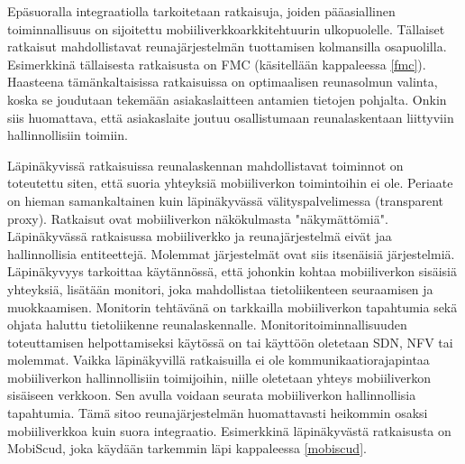 Epäsuoralla integraatiolla tarkoitetaan ratkaisuja, joiden pääasiallinen toiminnallisuus on sijoitettu mobiiliverkkoarkkitehtuurin ulkopuolelle. 
Tällaiset ratkaisut mahdollistavat reunajärjestelmän tuottamisen kolmansilla osapuolilla. Esimerkkinä tällaisesta ratkaisusta on FMC (käsitellään kappaleessa \ref{fmc}). Haasteena tämänkaltaisissa ratkaisuissa on optimaalisen reunasolmun valinta, koska se joudutaan tekemään asiakaslaitteen antamien tietojen pohjalta. Onkin siis huomattava, että asiakaslaite joutuu osallistumaan reunalaskentaan liittyviin hallinnollisiin toimiin.

Läpinäkyvissä ratkaisuissa reunalaskennan mahdollistavat toiminnot on toteutettu siten, että suoria yhteyksiä mobiiliverkon toimintoihin ei ole. 
Periaate on hieman samankaltainen kuin läpinäkyvässä välityspalvelimessa (transparent proxy).
Ratkaisut ovat mobiiliverkon näkökulmasta "näkymättömiä".
Läpinäkyvässä ratkaisussa mobiiliverkko ja reunajärjestelmä eivät jaa hallinnollisia entiteettejä. Molemmat järjestelmät ovat siis itsenäisiä järjestelmiä.
Läpinäkyvyys tarkoittaa käytännössä, että johonkin kohtaa mobiiliverkon sisäisiä yhteyksiä, lisätään monitori, joka mahdollistaa tietoliikenteen seuraamisen ja muokkaamisen. 
Monitorin tehtävänä on tarkkailla mobiiliverkon tapahtumia sekä ohjata haluttu tietoliikenne reunalaskennalle.
Monitoritoiminnallisuuden toteuttamisen helpottamiseksi käytössä on tai käyttöön oletetaan SDN, NFV tai molemmat.
Vaikka läpinäkyvillä ratkaisuilla ei ole kommunikaatiorajapintaa mobiiliverkon hallinnollisiin toimijoihin, niille oletetaan yhteys mobiiliverkon sisäiseen verkkoon. Sen avulla voidaan seurata mobiiliverkon hallinnollisia tapahtumia.
Tämä sitoo reunajärjestelmän huomattavasti heikommin osaksi mobiiliverkkoa kuin suora integraatio.
Esimerkkinä läpinäkyvästä ratkaisusta on MobiScud, joka käydään tarkemmin läpi kappaleessa \ref{mobiscud}. 
